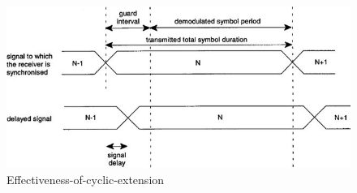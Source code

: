 \begin{figure}[ht]
    \centering
    \includegraphics[width=\textwidth]{Figures/Effectiveness-of-cyclic-extension}
    \caption{Effectiveness-of-cyclic-extension}
    \label{fig:cp2}
\end{figure}




\newpage
